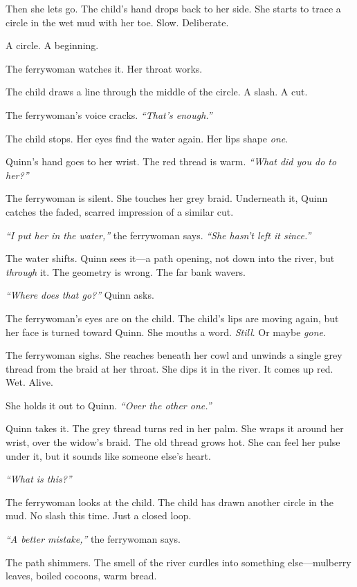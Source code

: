 \documentclass[11pt]{book}
\begin{document}
Then she lets go. The child's hand drops back to her side. She starts to trace a circle in the wet mud with her toe. Slow. Deliberate.

A circle. A beginning.

The ferrywoman watches it. Her throat works.

The child draws a line through the middle of the circle. A slash. A cut.

The ferrywoman's voice cracks. \emph{``That's enough.''}

The child stops. Her eyes find the water again. Her lips shape \emph{one}.

Quinn's hand goes to her wrist. The red thread is warm. \emph{``What did you do to her?''}

The ferrywoman is silent. She touches her grey braid. Underneath it, Quinn catches the faded, scarred impression of a similar cut.

\emph{``I put her in the water,''} the ferrywoman says. \emph{``She hasn't left it since.''}

The water shifts. Quinn sees it---a path opening, not down into the river, but \emph{through} it. The geometry is wrong. The far bank wavers.

\emph{``Where does that go?''} Quinn asks.

The ferrywoman's eyes are on the child. The child's lips are moving again, but her face is turned toward Quinn. She mouths a word. \emph{Still}. Or maybe \emph{gone}.

The ferrywoman sighs. She reaches beneath her cowl and unwinds a single grey thread from the braid at her throat. She dips it in the river. It comes up red. Wet. Alive.

She holds it out to Quinn. \emph{``Over the other one.''}

Quinn takes it. The grey thread turns red in her palm. She wraps it around her wrist, over the widow's braid. The old thread grows hot. She can feel her pulse under it, but it sounds like someone else's heart.

\emph{``What is this?''}

The ferrywoman looks at the child. The child has drawn another circle in the mud. No slash this time. Just a closed loop.

\emph{``A better mistake,''} the ferrywoman says.

The path shimmers. The smell of the river curdles into something else---mulberry leaves, boiled cocoons, warm bread.
\end{document}
